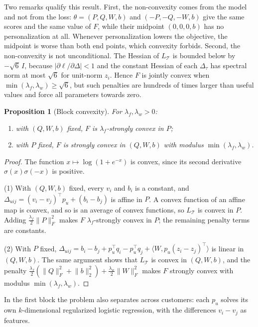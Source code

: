 \documentclass[12pt,a4paper]{article}
\newtheorem{proposition}{Proposition}
\newcommand{\norm}[1]{\lVert #1 \rVert}
\begin{document}
Two remarks qualify this result. First, the non-convexity comes from the model
and not from the loss: $\theta = (P, Q, W, b)$ and $(-P, -Q, -W, b)$ give the
same scores and the same value of $F$, while their midpoint $(0, 0, 0, b)$
has no personalization at all. Whenever personalization lowers the objective,
the midpoint is worse than both end points, which convexity forbids. Second,
the non-convexity is not unconditional. The Hessian of $L_{\mathcal{T}}$ is
bounded below by $-\sqrt{6}\, I$, because $|\partial \ell / \partial \Delta|
< 1$ and the constant Hessian of each $\Delta_\tau$ has spectral norm at most
$\sqrt{6}$ for unit-norm $z_i$. Hence $F$ is jointly convex when
$\min(\lambda_f, \lambda_w) \ge \sqrt{6}$, but such penalties are hundreds of
times larger than useful values and force all parameters towards zero.

\begin{proposition}[Block convexity]
For $\lambda_f, \lambda_w > 0$:
\begin{enumerate}
    \item with $(Q, W, b)$ fixed, $F$ is $\lambda_f$-strongly convex in $P$;
    \item with $P$ fixed, $F$ is strongly convex in $(Q, W, b)$ with modulus
    $\min(\lambda_f, \lambda_w)$.
\end{enumerate}
\end{proposition}

\begin{proof}
The function $x \mapsto \log(1 + e^{-x})$ is convex, since its second
derivative $\sigma(x)\sigma(-x)$ is positive.

(1) With $(Q, W, b)$ fixed, every $v_i$ and $b_i$ is a constant, and
$\Delta_{uij} = (v_i - v_j)^\top p_u + (b_i - b_j)$ is affine in $P$. A convex
function of an affine map is convex, and so is an average of convex functions,
so $L_{\mathcal{T}}$ is convex in $P$. Adding $\tfrac{\lambda_f}{2}\norm{P}_F^2$
makes $F$ $\lambda_f$-strongly convex in $P$; the remaining penalty terms are
constants.

(2) With $P$ fixed,
$\Delta_{uij} = b_i - b_j + p_u^\top q_i - p_u^\top q_j
+ \langle W, p_u (z_i - z_j)^\top \rangle$ is linear in $(Q, W, b)$. The same
argument shows that $L_{\mathcal{T}}$ is convex in $(Q, W, b)$, and the
penalty $\tfrac{\lambda_f}{2}(\norm{Q}_F^2 + \norm{b}_2^2)
+ \tfrac{\lambda_w}{2}\norm{W}_F^2$ makes $F$ strongly convex with modulus
$\min(\lambda_f, \lambda_w)$.
\end{proof}

In the first block the problem also separates across customers: each $p_u$
solves its own $k$-dimensional regularized logistic regression, with the
differences $v_i - v_j$ as features.
\end{document}
